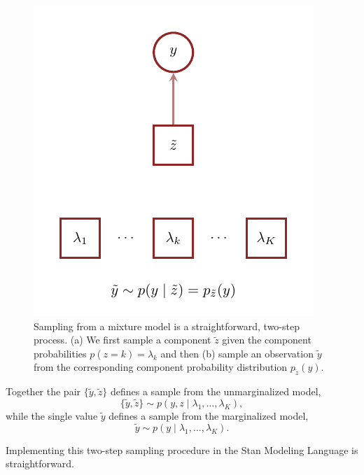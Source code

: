 \documentclass[
  letterpaper,
  DIV=11,
  numbers=noendperiod]{scrartcl}
\begin{document}
\begin{figure}
\begin{minipage}{0.45\linewidth}
{\captionsetup{labelsep=none}\includegraphics{figures/sampling/two/two.pdf}

}

\subcaption{\label{fig-sampling-two}}

\end{minipage}%

\caption{\label{fig-sampling}Sampling from a mixture model is a
straightforward, two-step process. (a) We first sample a component
\(\tilde{z}\) given the component probabilities
\(p(z = k) = \lambda_{k}\) and then (b) sample an observation
\(\tilde{y}\) from the corresponding component probability distribution
\(p_{\tilde{z}}(y)\).}

\end{figure}%

Together the pair \(\{ \tilde{y}, \tilde{z} \}\) defines a sample from
the unmarginalized model, \[
\{ \tilde{y}, \tilde{z} \}
\sim
p(y, z \mid \lambda_{1}, \ldots, \lambda_{K}),
\] while the single value \(\tilde{y}\) defines a sample from the
marginalized model, \[
\tilde{y} \sim p(y \mid \lambda_{1}, \ldots, \lambda_{K}).
\]

Implementing this two-step sampling procedure in the Stan Modeling
Language is straightforward.
\end{document}
